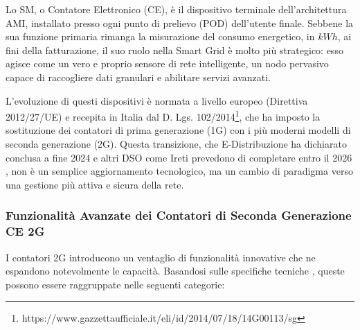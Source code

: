 Lo SM, o Contatore Elettronico (CE), è il dispositivo terminale dell'architettura AMI, installato presso ogni punto di prelievo (POD) dell'utente finale. Sebbene la sua funzione primaria rimanga la misurazione del consumo energetico, in $kWh$, ai fini della fatturazione, il suo ruolo nella Smart Grid è molto più strategico: esso agisce come un vero e proprio sensore di rete intelligente, un nodo pervasivo capace di raccogliere dati granulari e abilitare servizi avanzati.




L'evoluzione di questi dispositivi è normata a livello europeo (Direttiva 2012/27/UE) e recepita in Italia dal D. Lgs. 102/2014\footnote{https://www.gazzettaufficiale.it/eli/id/2014/07/18/14G00113/sg}, che ha imposto la sostituzione dei contatori di prima generazione (1G) con i più moderni modelli di seconda generazione (2G). Questa transizione, che E-Distribuzione ha dichiarato conclusa a fine 2024 \cite{sostituzione-contatori-e-dist} e altri DSO come Ireti prevedono di completare entro il 2026 \cite{sostituzione-contatori-Ireti}, non è un semplice aggiornamento tecnologico, ma un cambio di paradigma verso una gestione più attiva e sicura della rete.




\subsubsection{Funzionalità Avanzate dei Contatori di Seconda Generazione CE 2G} 

I contatori 2G introducono un ventaglio di funzionalità innovative che ne espandono notevolmente le capacità. Basandosi sulle specifiche tecniche \cite{chian2-e-dist}\cite{chian2-e-dist-FAQ}\cite{chain2-set-distribuzione}, queste possono essere raggruppate nelle seguenti categorie:

